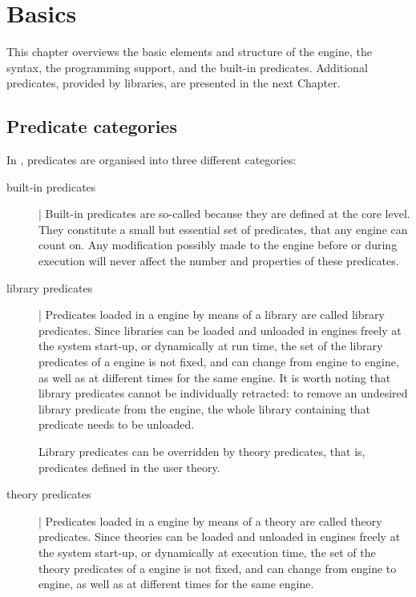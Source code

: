 \chapter{\tuprolog{} Basics}
\label{ch:engine}

This chapter overviews the basic elements and structure of the \tuprolog{} engine, the \tuprolog{} syntax, the programming support, and the built-in predicates.
%
Additional predicates, provided by libraries, are presented in the next Chapter.

\section{Predicate categories}
\label{sec:predicate-categories}

In \tuprolog{}, predicates are organised into three different categories:
%
\begin{description}
\item[built-in predicates] |
Built-in predicates are so-called because they are defined at the \tuprolog{} core level. They constitute a small but essential set of predicates, that any \tuprolog{} engine can count on.
%
Any modification possibly made to the engine before or during execution will never affect the number and properties of these predicates.


\item[library predicates] |
Predicates loaded in a \tuprolog{} engine by means of a \tuprolog{} library are called library predicates.
%
Since libraries can be loaded and unloaded in \tuprolog{} engines freely at the system start-up, or dynamically at run time, the set of the library predicates of a \tuprolog{} engine is not fixed, and can change from engine to engine, as well as at different times for the same engine.
%
It is worth noting that library predicates cannot be individually retracted: to remove an undesired library predicate from the engine, the whole library containing that predicate needs to be unloaded.
%

Library predicates can be overridden by theory predicates, that is, predicates defined in the user theory.


\item[theory predicates] |
Predicates loaded in a \tuprolog{} engine by means of a \tuprolog{} theory are called theory predicates.
%
Since theories can be loaded and unloaded in \tuprolog{} engines freely at the system start-up, or dynamically at execution time, the set of the theory predicates of a \tuprolog{} engine is not fixed, and can change from engine to engine, as well as at different times for the same engine.
%
\end{description}


